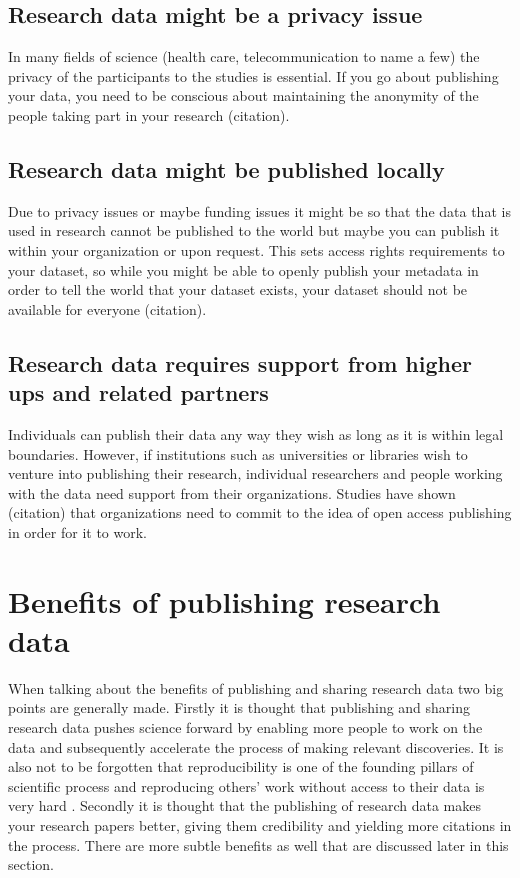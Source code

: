\subsection{Research data might be a privacy issue}

In many fields of science (health care, telecommunication to name a few) the
privacy of the participants to the studies is essential. If you go about
publishing your data, you need to be conscious about maintaining the anonymity
of the people taking part in your research (citation).

\subsection{Research data might be published locally}

Due to privacy issues or maybe funding issues it might be so that the data
that is used in research cannot be published to the world but maybe you can
publish it within your organization or upon request. This sets access rights
requirements to your dataset, so while you might be able to openly publish
your metadata in order to tell the world that your dataset exists, your dataset
should not be available for everyone (citation). 

\subsection{Research data requires support from higher ups and related partners}

Individuals can publish their data any way they wish as long as it is within
legal boundaries. However, if institutions such as universities or libraries
wish to venture into publishing their research, individual researchers and
people working with the data need support from their organizations. Studies
have shown (citation) that organizations need to commit to the idea of open
access publishing in order for it to work.

\fi

\section{Benefits of publishing research data}
\label{sec:research_data_benefits}

When talking about the benefits of publishing and sharing research data two big
points are generally made. Firstly it is thought that publishing and sharing
research data pushes science forward by enabling more people to work on the
data and subsequently accelerate the process of making relevant discoveries.
It is also not to be forgotten that reproducibility is one of the founding
pillars of scientific process and reproducing others' work without access
to their data is very hard \cite{jasny2011again}.
Secondly it is thought that the publishing of research data makes your
research papers better, giving them credibility and yielding more citations in
the process. There are more subtle benefits as well that are discussed later
in this section.

